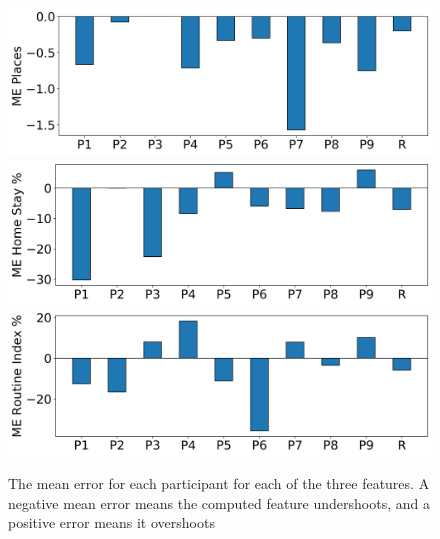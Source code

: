 \begin{figure}[h]
    \centering
    \includegraphics[width=\textwidth]{images/study/me_places.png}
    \includegraphics[width=\textwidth]{images/study/me_homestay.png}
    \includegraphics[width=\textwidth]{images/study/me_routine.png}
    \caption{The mean error for each participant for each of the three features. A negative mean error means the computed feature undershoots, and a positive error means it overshoots}
    \label{fig:plot-mean-error}
\end{figure}




